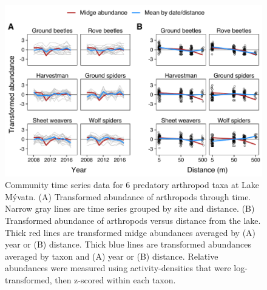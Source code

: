 \documentclass[12pt]{article}
\begin{document}
\clearpage

\begin{figure}
\centering
\includegraphics{fig1.pdf}
\caption{\label{fig:obs-data}
Community time series data for 6 predatory arthropod taxa at Lake M\'{y}vatn.
(A) Transformed abundance of arthropods through time.
Narrow gray lines are time series grouped by site and distance.
(B) Transformed abundance of arthropods versus distance from the lake.
Thick red lines are transformed midge abundances averaged by (A) year or (B) distance.
Thick blue lines are transformed abundances averaged by taxon and
(A) year or (B) distance.
Relative abundances were measured using activity-densities that were log-transformed,
then z-scored within each taxon.
}
\end{figure}




\clearpage
\end{document}
